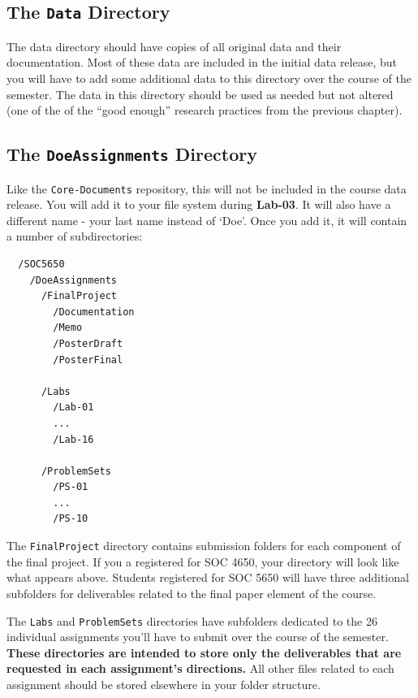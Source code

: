 \documentclass[]{book}
\theoremstyle{definition}
\theoremstyle{definition}
\theoremstyle{definition}
\theoremstyle{remark}
\begin{document}
\subsection{\texorpdfstring{The \texttt{Data}
Directory}{The Data Directory}}\label{the-data-directory}

The data directory should have copies of all original data and their
documentation. Most of these data are included in the initial data
release, but you will have to add some additional data to this directory
over the course of the semester. The data in this directory should be
used as needed but not altered (one of the of the ``good enough''
research practices from the previous chapter).

\subsection{\texorpdfstring{The \texttt{DoeAssignments}
Directory}{The DoeAssignments Directory}}\label{the-doeassignments-directory}

Like the \texttt{Core-Documents} repository, this will not be included
in the course data release. You will add it to your file system during
\textbf{Lab-03}. It will also have a different name - your last name
instead of `Doe'. Once you add it, it will contain a number of
subdirectories:

\begin{verbatim}
  /SOC5650
    /DoeAssignments
      /FinalProject
        /Documentation
        /Memo
        /PosterDraft
        /PosterFinal

      /Labs
        /Lab-01
        ...
        /Lab-16

      /ProblemSets
        /PS-01
        ...
        /PS-10
\end{verbatim}

The \texttt{FinalProject} directory contains submission folders for each
component of the final project. If you a registered for SOC 4650, your
directory will look like what appears above. Students registered for SOC
5650 will have three additional subfolders for deliverables related to
the final paper element of the course.

The \texttt{Labs} and \texttt{ProblemSets} directories have subfolders
dedicated to the 26 individual assignments you'll have to submit over
the course of the semester. \textbf{These directories are intended to
store only the deliverables that are requested in each assignment's
directions.} All other files related to each assignment should be stored
elsewhere in your folder structure.
\end{document}
